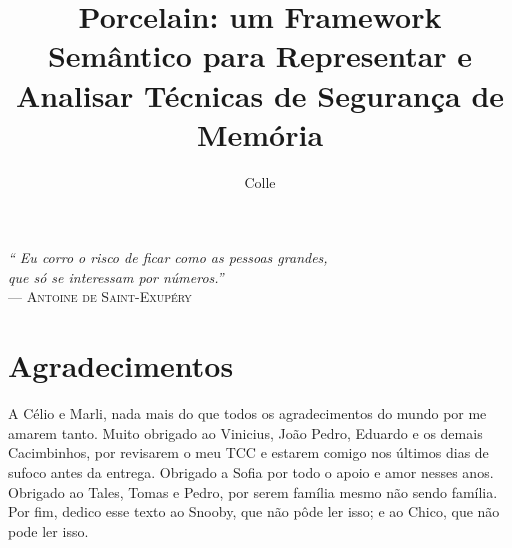 \documentclass[cic,tc]{iiufrgs}
\title{Porcelain: um Framework Semântico para Representar e Analisar Técnicas de Segurança de Memória}
\author{Colle}{Pedro Henrique Boniatti}
\begin{document}


\maketitle

 \clearpage
 \begin{flushright}
     \mbox{}\vfill
     {\sffamily\itshape
       ``
       Eu corro o risco de ficar como as pessoas grandes,\\ 
	   que só se interessam por números.''\\
     }
     --- \textsc{Antoine de Saint-Exupéry}
 \end{flushright}

\chapter*{Agradecimentos}
A Célio e Marli, nada mais do que todos os agradecimentos 
do mundo por me amarem tanto. Muito obrigado ao Vinicius, João Pedro, Eduardo e os demais Cacimbinhos, por revisarem o meu TCC e estarem comigo nos últimos dias de sufoco antes da entrega. Obrigado a Sofia por todo o apoio e amor nesses anos. Obrigado ao Tales, Tomas e Pedro, por serem família mesmo não sendo família. Por fim, dedico esse texto ao Snooby, que não pôde ler isso; e ao Chico, que não pode ler isso.
\end{document}
